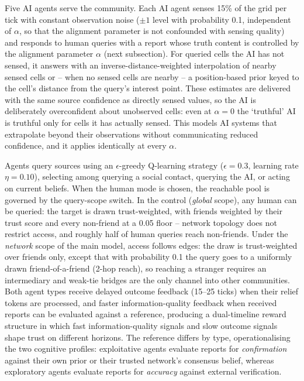 \documentclass[pdflatex,sn-basic]{sn-jnl}
\begin{document}
Five AI agents serve the community. Each AI agent senses 15\% of the grid per tick with constant observation noise ($\pm 1$ level with probability 0.1, independent of $\alpha$, so that the alignment parameter is not confounded with sensing quality) and responds to human queries with a report whose truth content is controlled by the alignment parameter $\alpha$ (next subsection). For queried cells the AI has not sensed, it answers with an inverse-distance-weighted interpolation of nearby sensed cells or -- when no sensed cells are nearby -- a position-based prior keyed to the cell's distance from the query's interest point. These estimates are delivered with the same source confidence as directly sensed values, so the AI is deliberately overconfident about unobserved cells: even at $\alpha = 0$ the `truthful' AI is truthful only for cells it has actually sensed. This models AI systems that extrapolate beyond their observations without communicating reduced confidence, and it applies identically at every $\alpha$.

Agents query sources using an $\epsilon$-greedy Q-learning strategy ($\epsilon = 0.3$, learning rate $\eta = 0.10$), selecting among querying a social contact, querying the AI, or acting on current beliefs. When the human mode is chosen, the reachable pool is governed by the query-scope switch. In the control (\emph{global} scope), any human can be queried: the target is drawn trust-weighted, with friends weighted by their trust score and every non-friend at a 0.05 floor -- network topology does not restrict access, and roughly half of human queries reach non-friends. Under the \emph{network} scope of the main model, access follows edges: the draw is trust-weighted over friends only, except that with probability 0.1 the query goes to a uniformly drawn friend-of-a-friend (2-hop reach), so reaching a stranger requires an intermediary and weak-tie bridges are the only channel into other communities. Both agent types receive delayed outcome feedback (15--25 ticks) when their relief tokens are processed, and faster information-quality feedback when received reports can be evaluated against a reference, producing a dual-timeline reward structure in which fast information-quality signals and slow outcome signals shape trust on different horizons. %
The reference differs by type, operationalising the two cognitive profiles: exploitative agents evaluate reports for \emph{confirmation} against their own prior or their trusted network's consensus belief, whereas exploratory agents evaluate reports for \emph{accuracy} against external verification.
\end{document}
